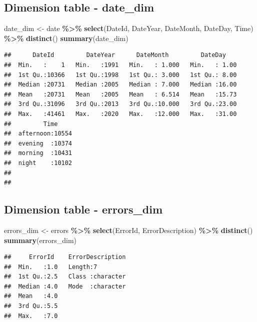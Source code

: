 \documentclass[
]{article}
\newenvironment{Shaded}{\begin{snugshade}}{\end{snugshade}}
\newcommand{\FunctionTok}[1]{\textcolor[rgb]{0.13,0.29,0.53}{\textbf{#1}}}
\newcommand{\NormalTok}[1]{#1}
\newcommand{\OtherTok}[1]{\textcolor[rgb]{0.56,0.35,0.01}{#1}}
\newcommand{\SpecialCharTok}[1]{\textcolor[rgb]{0.81,0.36,0.00}{\textbf{#1}}}
\begin{document}
\subsection{Dimension table -
date\_dim}\label{dimension-table---date_dim}

\begin{Shaded}
\begin{Highlighting}[]
\NormalTok{date\_dim }\OtherTok{\textless{}{-}}\NormalTok{ date }\SpecialCharTok{\%\textgreater{}\%} \FunctionTok{select}\NormalTok{(DateId, DateYear, DateMonth, }
\NormalTok{                            DateDay, Time) }\SpecialCharTok{\%\textgreater{}\%} \FunctionTok{distinct}\NormalTok{()}
\FunctionTok{summary}\NormalTok{(date\_dim)}
\end{Highlighting}
\end{Shaded}

\begin{verbatim}
##      DateId         DateYear      DateMonth         DateDay     
##  Min.   :    1   Min.   :1991   Min.   : 1.000   Min.   : 1.00  
##  1st Qu.:10366   1st Qu.:1998   1st Qu.: 3.000   1st Qu.: 8.00  
##  Median :20731   Median :2005   Median : 7.000   Median :16.00  
##  Mean   :20731   Mean   :2005   Mean   : 6.514   Mean   :15.73  
##  3rd Qu.:31096   3rd Qu.:2013   3rd Qu.:10.000   3rd Qu.:23.00  
##  Max.   :41461   Max.   :2020   Max.   :12.000   Max.   :31.00  
##         Time      
##  afternoon:10554  
##  evening  :10374  
##  morning  :10431  
##  night    :10102  
##                   
## 
\end{verbatim}

\subsection{Dimension table -
errors\_dim}\label{dimension-table---errors_dim}

\begin{Shaded}
\begin{Highlighting}[]
\NormalTok{errors\_dim }\OtherTok{\textless{}{-}}\NormalTok{ errors }\SpecialCharTok{\%\textgreater{}\%} \FunctionTok{select}\NormalTok{(ErrorId, ErrorDescription) }\SpecialCharTok{\%\textgreater{}\%} \FunctionTok{distinct}\NormalTok{()}
\FunctionTok{summary}\NormalTok{(errors\_dim)}
\end{Highlighting}
\end{Shaded}

\begin{verbatim}
##     ErrorId    ErrorDescription  
##  Min.   :1.0   Length:7          
##  1st Qu.:2.5   Class :character  
##  Median :4.0   Mode  :character  
##  Mean   :4.0                     
##  3rd Qu.:5.5                     
##  Max.   :7.0
\end{verbatim}
\end{document}
